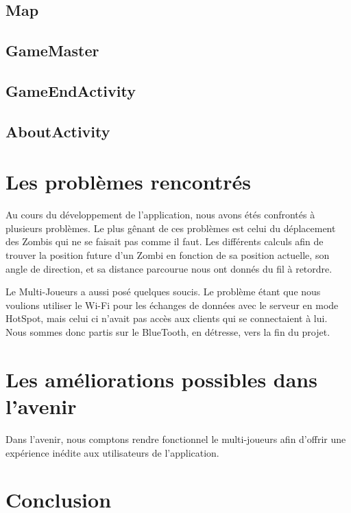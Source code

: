 \documentclass{article}
\begin{document}
\subsection{Map}
\subsection{GameMaster}
\subsection{GameEndActivity}
\subsection{AboutActivity}


\section{Les problèmes rencontrés}


Au cours du développement de l'application, nous avons étés confrontés à plusieurs problèmes.
Le plus gênant de ces problèmes est celui du déplacement des Zombis qui ne se faisait pas comme il faut.
Les différents calculs afin de trouver la position future d'un Zombi en fonction de sa position actuelle,
son angle de direction, et sa distance parcourue nous ont donnés du fil à retordre.

Le Multi-Joueurs a aussi posé quelques soucis.
Le problème étant que nous voulions utiliser le Wi-Fi pour les échanges de données avec le serveur en mode HotSpot,
mais celui ci n'avait pas accès aux clients qui se connectaient à lui.
Nous sommes donc partis sur le BlueTooth, en détresse, vers la fin du projet.


\section{Les améliorations possibles dans l'avenir}


Dans l'avenir, nous comptons rendre fonctionnel le multi-joueurs afin d'offrir une expérience inédite aux utilisateurs de l'application.


\section{Conclusion}

  
\end{document}
